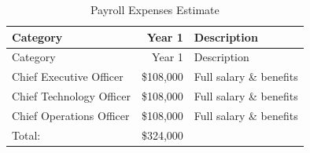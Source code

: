 \documentclass[10pt,openany]{book}
\begin{document}
\begin{longtable}[]{@{}lrl@{}}
\caption{Payroll Expenses Estimate}\tabularnewline
\toprule
\begin{minipage}[b]{0.34\columnwidth}\raggedright
Category\strut
\end{minipage} & \begin{minipage}[b]{0.16\columnwidth}\raggedleft
Year 1\strut
\end{minipage} & \begin{minipage}[b]{0.32\columnwidth}\raggedright
Description\strut
\end{minipage}\tabularnewline
\midrule
\endfirsthead
\toprule
\begin{minipage}[b]{0.34\columnwidth}\raggedright
Category\strut
\end{minipage} & \begin{minipage}[b]{0.16\columnwidth}\raggedleft
Year 1\strut
\end{minipage} & \begin{minipage}[b]{0.32\columnwidth}\raggedright
Description\strut
\end{minipage}\tabularnewline
\midrule
\endhead
\begin{minipage}[t]{0.34\columnwidth}\raggedright
Chief Executive Officer\strut
\end{minipage} & \begin{minipage}[t]{0.16\columnwidth}\raggedleft
\$108,000\strut
\end{minipage} & \begin{minipage}[t]{0.32\columnwidth}\raggedright
Full salary \& benefits\strut
\end{minipage}\tabularnewline
\begin{minipage}[t]{0.34\columnwidth}\raggedright
Chief Technology Officer\strut
\end{minipage} & \begin{minipage}[t]{0.16\columnwidth}\raggedleft
\$108,000\strut
\end{minipage} & \begin{minipage}[t]{0.32\columnwidth}\raggedright
Full salary \& benefits\strut
\end{minipage}\tabularnewline
\begin{minipage}[t]{0.34\columnwidth}\raggedright
Chief Operations Officer\strut
\end{minipage} & \begin{minipage}[t]{0.16\columnwidth}\raggedleft
\$108,000\strut
\end{minipage} & \begin{minipage}[t]{0.32\columnwidth}\raggedright
Full salary \& benefits\strut
\end{minipage}\tabularnewline
\begin{minipage}[t]{0.34\columnwidth}\raggedright
Total:\strut
\end{minipage} & \begin{minipage}[t]{0.16\columnwidth}\raggedleft
\$324,000\strut
\end{minipage} & \begin{minipage}[t]{0.32\columnwidth}\raggedright
\strut
\end{minipage}\tabularnewline
\bottomrule
\end{longtable}
\end{document}
